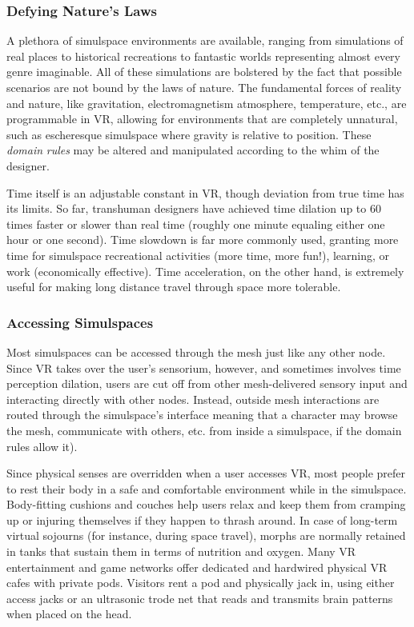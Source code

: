 \subsubsection{Defying Nature's Laws}

A plethora of simulspace environments are available, 
ranging from simulations of real places to historical 
recreations to fantastic worlds representing almost 
every genre imaginable. All of these simulations are 
bolstered by the fact that possible scenarios are not 
bound by the laws of nature. The fundamental forces 
of reality and nature, like gravitation, electromagnetism
atmosphere, temperature, etc., are programmable
in VR, allowing for environments that are
completely unnatural, such as escheresque simulspace 
where gravity is relative to position. These \textit{domain }
\textit{rules} may be altered and manipulated according to 
the whim of the designer.

Time itself is an adjustable constant in VR, though 
deviation from true time has its limits. So far, transhuman
designers have achieved time dilation up to
60 times faster or slower than real time (roughly one 
minute equaling either one hour or one second). Time 
slowdown is far more commonly used, granting more 
time for simulspace recreational activities (more time, 
more fun!), learning, or work (economically effective). 
Time acceleration, on the other hand, is extremely 
useful for making long distance travel through space 
more tolerable.

\subsubsection{Accessing Simulspaces}

Most simulspaces can be accessed through the mesh 
just like any other node. Since VR takes over the 
user's sensorium, however, and sometimes involves 
time perception dilation, users are cut off from other 
mesh-delivered sensory input and interacting directly 
with other nodes. Instead, outside mesh interactions 
are routed through the simulspace's interface meaning
that a character may browse the mesh, communicate
with others, etc. from inside a simulspace, if the
domain rules allow it).

Since physical senses are overridden when a user 
accesses VR, most people prefer to rest their body 
in a safe and comfortable environment while in the 
simulspace. Body-fitting cushions and couches help 
users relax and keep them from cramping up or injuring
themselves if they happen to thrash around.
In case of long-term virtual sojourns (for instance, 
during space travel), morphs are normally retained 
in tanks that sustain them in terms of nutrition and 
oxygen. Many VR entertainment and game networks 
offer dedicated and hardwired physical VR cafes 
with private pods. Visitors rent a pod and physically 
jack in, using either access jacks or an ultrasonic 
trode net that reads and transmits brain patterns 
when placed on the head.

